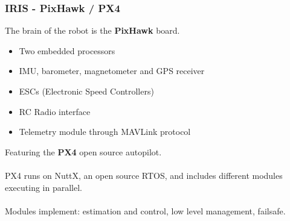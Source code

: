 \documentclass[xcolor=dvipsnames]{beamer}
\begin{document}
\begin{frame}
\frametitle{IRIS - PixHawk / PX4}
The brain of the robot is the \textbf{PixHawk} board. 
\begin{itemize}
\item Two embedded processors
\item IMU, barometer, magnetometer  and GPS receiver
\item ESCs (Electronic Speed Controllers) 
\item RC Radio interface
\item Telemetry module through MAVLink protocol
\end{itemize}
Featuring the \textbf{PX4} open source autopilot. \\~\\
PX4 runs on NuttX, an open source RTOS, and includes different modules executing in parallel. 
\\~\\
Modules implement: estimation and control, low level management, failsafe.
\end{frame}
\end{document}
